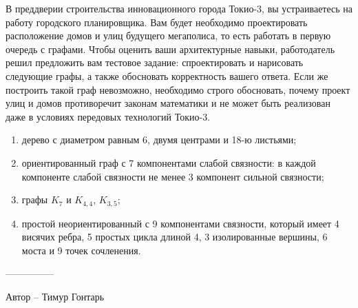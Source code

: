 \question
В преддверии строительства инновационного города Токио-3, вы устраиваетесь на работу городского планировщика. Вам будет необходимо проектировать расположение домов и улиц будущего мегаполиса, то есть работать в первую очередь с графами. Чтобы оценить ваши архитектурные навыки, работодатель решил предложить вам тестовое задание: спроектировать и нарисовать следующие графы, а также обосновать корректность вашего ответа. Если же построить такой граф невозможно, необходимо строго обосновать, почему проект улиц и домов противоречит законам математики и не может быть реализован даже в условиях передовых технологий Токио-3.

\begin{enumerate}
\item  дерево с диаметром равным 6, двумя центрами  и  18-ю листьями;
\item  ориентированный граф с 7 компонентами слабой связности: в  каждой компоненте слабой связности не менее 3 компонент сильной связности;
\item  графы $K_7$ и $K_{4,4}$, $K_{3,5}$;
\item  простой неориентированный с 9 компонентами связности, который имеет 4 висячих ребра, 5 простых цикла длиной 4, 3 изолированные вершины, 6 моста и 9 точек сочленения.
\end{enumerate}

---------------

Автор -- Тимур Гонтарь
